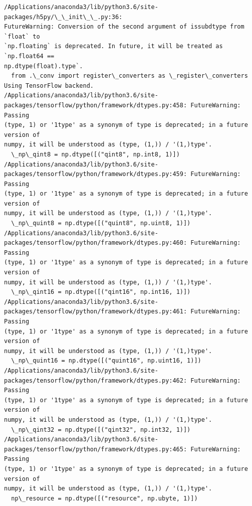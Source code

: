 \documentclass[11pt]{article}
\begin{document}
    \begin{Verbatim}[commandchars=\\\{\}]
/Applications/anaconda3/lib/python3.6/site-packages/h5py/\_\_init\_\_.py:36:
FutureWarning: Conversion of the second argument of issubdtype from `float` to
`np.floating` is deprecated. In future, it will be treated as `np.float64 ==
np.dtype(float).type`.
  from .\_conv import register\_converters as \_register\_converters
Using TensorFlow backend.
/Applications/anaconda3/lib/python3.6/site-
packages/tensorflow/python/framework/dtypes.py:458: FutureWarning: Passing
(type, 1) or '1type' as a synonym of type is deprecated; in a future version of
numpy, it will be understood as (type, (1,)) / '(1,)type'.
  \_np\_qint8 = np.dtype([("qint8", np.int8, 1)])
/Applications/anaconda3/lib/python3.6/site-
packages/tensorflow/python/framework/dtypes.py:459: FutureWarning: Passing
(type, 1) or '1type' as a synonym of type is deprecated; in a future version of
numpy, it will be understood as (type, (1,)) / '(1,)type'.
  \_np\_quint8 = np.dtype([("quint8", np.uint8, 1)])
/Applications/anaconda3/lib/python3.6/site-
packages/tensorflow/python/framework/dtypes.py:460: FutureWarning: Passing
(type, 1) or '1type' as a synonym of type is deprecated; in a future version of
numpy, it will be understood as (type, (1,)) / '(1,)type'.
  \_np\_qint16 = np.dtype([("qint16", np.int16, 1)])
/Applications/anaconda3/lib/python3.6/site-
packages/tensorflow/python/framework/dtypes.py:461: FutureWarning: Passing
(type, 1) or '1type' as a synonym of type is deprecated; in a future version of
numpy, it will be understood as (type, (1,)) / '(1,)type'.
  \_np\_quint16 = np.dtype([("quint16", np.uint16, 1)])
/Applications/anaconda3/lib/python3.6/site-
packages/tensorflow/python/framework/dtypes.py:462: FutureWarning: Passing
(type, 1) or '1type' as a synonym of type is deprecated; in a future version of
numpy, it will be understood as (type, (1,)) / '(1,)type'.
  \_np\_qint32 = np.dtype([("qint32", np.int32, 1)])
/Applications/anaconda3/lib/python3.6/site-
packages/tensorflow/python/framework/dtypes.py:465: FutureWarning: Passing
(type, 1) or '1type' as a synonym of type is deprecated; in a future version of
numpy, it will be understood as (type, (1,)) / '(1,)type'.
  np\_resource = np.dtype([("resource", np.ubyte, 1)])
    \end{Verbatim}
\end{document}

